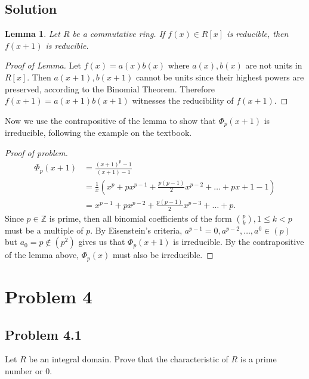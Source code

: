\documentclass{article}
\theoremstyle{plain}
\newtheorem*{lemma*}{Lemma}
\newcommand{\Z}{\mathbb{Z}}
\begin{document}
\subsection*{Solution}
\begin{lemma*}
  Let $R$ be a commutative ring. If $f(x)\in R[x]$ is reducible, then $f(x+1)$ is
  reducible.
\end{lemma*}
\begin{proof}[Proof of Lemma]
  Let $f(x)=a(x)b(x)$ where $a(x), b(x)$ are not units in $R[x]$. Then
  $a(x+1), b(x+1)$ cannot be units since their highest powers are preserved,
  according to the Binomial Theorem. Therefore $f(x+1)=a(x+1)b(x+1)$ witnesses
  the reducibility of $f(x+1)$.
\end{proof}
Now we use the contrapositive of the lemma to show that $\Phi_{p}(x+1)$ is
irreducible, following the example on the textbook.
\begin{proof}[Proof of problem]
  \begin{align*}
    \Phi_{p}(x+1)&=\frac{(x+1)^{p}-1}{(x+1)-1}\\
              &=\frac{1}{x}(x^{p}+px^{p-1}+\frac{p(p-1)}{2}x^{p-2}+\ldots+px+1-1)\\
              &=x^{p-1}+px^{p-2}+\frac{p(p-1)}{2}x^{p-3}+\ldots+p.
  \end{align*}
  Since $p\in\Z$ is prime, then all binomial coefficients of the form
  $\binom{p}{k}, 1\le k<p$ must be a multiple of $p$. By Eisenstein's criteria,
  $a^{p-1}=0, a^{p-2},\ldots,a^{0}\in(p)$ but $a_{0}=p\notin(p^{2})$ gives us that
  $\Phi_{p}(x+1)$ is irreducible. By the contrapositive of the lemma above,
  $\Phi_{p}(x)$ must also be irreducible.
\end{proof}

\section*{Problem 4}
\subsection*{Problem 4.1}
Let $R$ be an integral domain. Prove that the characteristic of $R$ is a prime
number or $0$.
\end{document}
